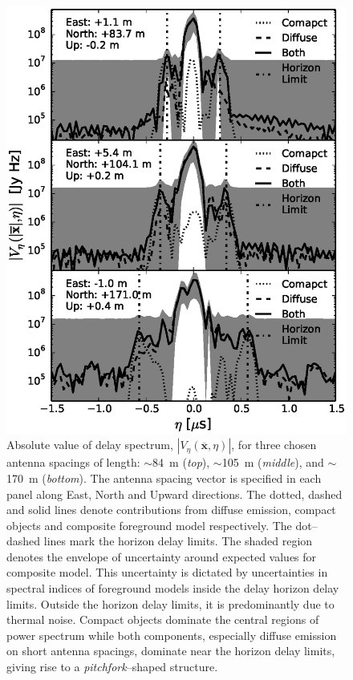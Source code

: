 \documentclass[preprint2,iop,numberedappendix]{emulateapj}
\begin{document}
\begin{figure}[htb]
\centering
\includegraphics[width=\linewidth]{figures/v1_0/delta_array_3_baseline_comparison_visibilities_0.3m_ground_custom_gaussian_FG_model_all_sky_nside_64_Tsys_90.0K_185.0_MHz_30.7_MHz_bnw2.0.eps}
\caption{Absolute value of delay spectrum, $|V_\eta(\overline{\mathbf{x}},\eta)|$, for three chosen antenna spacings of length: $\sim$84~m ({\it top}), $\sim$105~m ({\it middle}), and $\sim$170~m ({\it bottom}). The antenna spacing vector is specified in each panel along East, North and Upward directions. The dotted, dashed and solid lines denote contributions from diffuse emission, compact objects and composite foreground model respectively. The dot--dashed lines mark the horizon delay limits. The shaded region denotes the envelope of uncertainty around expected values for composite model. This uncertainty is dictated by uncertainties in spectral indices of foreground models inside the delay horizon delay limits. Outside the horizon delay limits, it is predominantly due to thermal noise. Compact objects dominate the central regions of power spectrum while both components, especially diffuse emission on short antenna spacings, dominate near the horizon delay limits, giving rise to a {\it pitchfork}--shaped structure. \label{fig:pitchfork-baselines}}
\end{figure}
\end{document}
